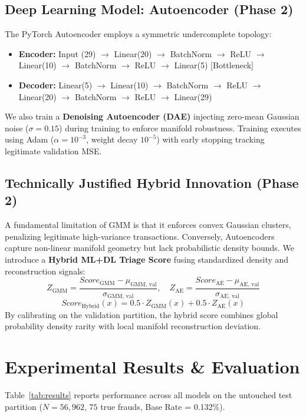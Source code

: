 \documentclass[conference]{IEEEtran}
\begin{document}
\subsection{Deep Learning Model: Autoencoder (Phase 2)}
The PyTorch Autoencoder employs a symmetric undercomplete topology:
\begin{itemize}
    \item \textbf{Encoder:} Input (29) $\to$ Linear(20) $\to$ BatchNorm $\to$ ReLU $\to$ Linear(10) $\to$ BatchNorm $\to$ ReLU $\to$ Linear(5) [Bottleneck]
    \item \textbf{Decoder:} Linear(5) $\to$ Linear(10) $\to$ BatchNorm $\to$ ReLU $\to$ Linear(20) $\to$ BatchNorm $\to$ ReLU $\to$ Linear(29)
\end{itemize}
We also train a \textbf{Denoising Autoencoder (DAE)} injecting zero-mean Gaussian noise ($\sigma = 0.15$) during training to enforce manifold robustness. Training executes using Adam ($\alpha = 10^{-3}$, weight decay $10^{-5}$) with early stopping tracking legitimate validation MSE.

\subsection{Technically Justified Hybrid Innovation (Phase 2)}
A fundamental limitation of GMM is that it enforces convex Gaussian clusters, penalizing legitimate high-variance transactions. Conversely, Autoencoders capture non-linear manifold geometry but lack probabilistic density bounds. We introduce a \textbf{Hybrid ML+DL Triage Score} fusing standardized density and reconstruction signals:
\begin{equation}
Z_{\text{GMM}} = \frac{Score_{\text{GMM}} - \mu_{\text{GMM, val}}}{\sigma_{\text{GMM, val}}}, \quad Z_{\text{AE}} = \frac{Score_{\text{AE}} - \mu_{\text{AE, val}}}{\sigma_{\text{AE, val}}}
\end{equation}
\begin{equation}
Score_{\text{Hybrid}}(x) = 0.5 \cdot Z_{\text{GMM}}(x) + 0.5 \cdot Z_{\text{AE}}(x)
\end{equation}
By calibrating on the validation partition, the hybrid score combines global probability density rarity with local manifold reconstruction deviation.

\section{Experimental Results \& Evaluation}

Table~\ref{tab:results} reports performance across all models on the untouched test partition ($N = 56,962$, $75$ true frauds, Base Rate = 0.132\%).
\end{document}
